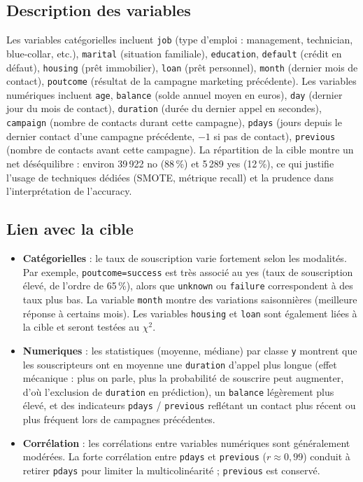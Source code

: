 \documentclass[11pt,a4paper]{article}
\begin{document}
\subsection{Description des variables}
Les variables catégorielles incluent \texttt{job} (type d'emploi : management, technician, blue-collar, etc.), \texttt{marital} (situation familiale), \texttt{education}, \texttt{default} (crédit en défaut), \texttt{housing} (prêt immobilier), \texttt{loan} (prêt personnel), \texttt{month} (dernier mois de contact), \texttt{poutcome} (résultat de la campagne marketing précédente). Les variables numériques incluent \texttt{age}, \texttt{balance} (solde annuel moyen en euros), \texttt{day} (dernier jour du mois de contact), \texttt{duration} (durée du dernier appel en secondes), \texttt{campaign} (nombre de contacts durant cette campagne), \texttt{pdays} (jours depuis le dernier contact d'une campagne précédente, $-1$ si pas de contact), \texttt{previous} (nombre de contacts avant cette campagne). La répartition de la cible montre un net déséquilibre : environ 39\,922 no (88\,\%) et 5\,289 yes (12\,\%), ce qui justifie l'usage de techniques dédiées (SMOTE, métrique recall) et la prudence dans l'interprétation de l'accuracy.

\subsection{Lien avec la cible}
\begin{itemize}
  \item \textbf{Catégorielles} : le taux de souscription varie fortement selon les modalités. Par exemple, \texttt{poutcome=success} est très associé au yes (taux de souscription élevé, de l'ordre de 65\,\%), alors que \texttt{unknown} ou \texttt{failure} correspondent à des taux plus bas. La variable \texttt{month} montre des variations saisonnières (meilleure réponse à certains mois). Les variables \texttt{housing} et \texttt{loan} sont également liées à la cible et seront testées au $\chi^2$.
  \item \textbf{Numeriques} : les statistiques (moyenne, médiane) par classe \texttt{y} montrent que les souscripteurs ont en moyenne une \texttt{duration} d'appel plus longue (effet mécanique : plus on parle, plus la probabilité de souscrire peut augmenter, d'où l'exclusion de \texttt{duration} en prédiction), un \texttt{balance} légèrement plus élevé, et des indicateurs \texttt{pdays} / \texttt{previous} reflétant un contact plus récent ou plus fréquent lors de campagnes précédentes.
  \item \textbf{Corrélation} : les corrélations entre variables numériques sont généralement modérées. La forte corrélation entre \texttt{pdays} et \texttt{previous} ($r \approx 0{,}99$) conduit à retirer \texttt{pdays} pour limiter la multicolinéarité ; \texttt{previous} est conservé.
\end{itemize}
\end{document}
